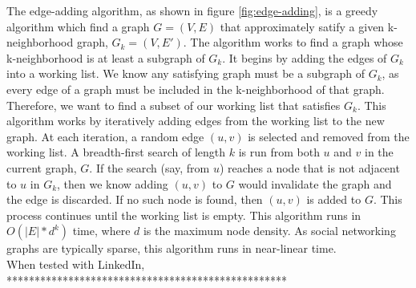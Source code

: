 \indent The edge-adding algorithm, as shown in figure \ref{fig:edge-adding}, is a greedy algorithm which find a graph $G = (V,E)$ that approximately satify a given k-neighborhood graph, $G_k = (V, E')$. The algorithm works to find a graph whose k-neighborhood is at least a subgraph of $G_k$. It begins by adding the edges of $G_k$ into a working list. We know any satisfying graph must be a subgraph of $G_k$, as every edge of a graph must be included in the k-neighborhood of that graph. Therefore, we want to find a subset of our working list that satisfies $G_k$. This algorithm works by iteratively adding edges from the working list to the new graph.  At each iteration, a random edge $(u,v)$ is selected and removed from the working list. A breadth-first search of length $k$ is run from both $u$ and $v$ in the current graph, $G$. If the search (say, from $u$) reaches a node that is not adjacent to $u$ in $G_k$, then we know adding $(u,v)$ to $G$ would invalidate the graph and the edge is discarded. If no such node is found, then $(u,v)$ is added to $G$. This process continues until the working list is empty. This algorithm runs in $O(|E|*d^k)$ time, where $d$ is the maximum node density. As social networking graphs are typically sparse, this algorithm runs in near-linear time. \\

\indent When tested with LinkedIn, ************************************************** \\
